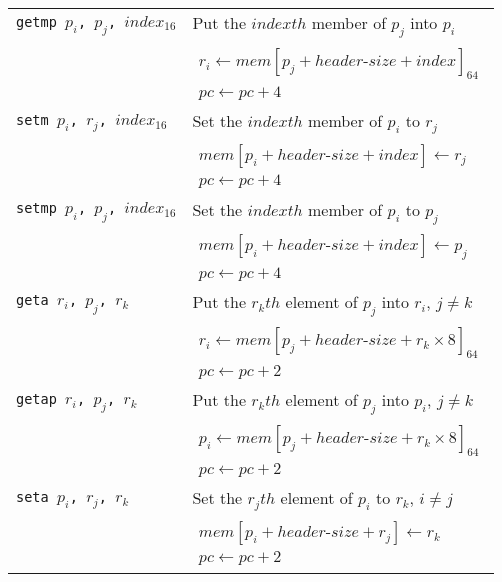 \begin{longtable}{|p{10em}|p{30em}|}
			\texttt{getmp $p_i$, $p_j$, $index_{16}$} & Put the $indexth$ member of $p_j$ into $p_i$ \\*
			& $\begin{array}{lcl}
			r_i \leftarrow mem[p_j + header\mbox{-}size + index]_{64} \\
			pc \leftarrow pc + 4
			\end{array}$ \\
			\hline
			\texttt{setm $p_i$, $r_j$, $index_{16}$} & Set the $indexth$ member of $p_i$ to $r_j$ \\*
			& $\begin{array}{lcl}
			mem[p_i + header\mbox{-}size + index] \leftarrow r_j \\
			pc \leftarrow pc + 4
			\end{array}$ \\
			\hline
			\texttt{setmp $p_i$, $p_j$, $index_{16}$} & Set the $indexth$ member of $p_i$ to $p_j$ \\*
			& $\begin{array}{lcl}
			mem[p_i + header\mbox{-}size + index] \leftarrow p_j \\
			pc \leftarrow pc + 4
			\end{array}$ \\
			\hline
			\texttt{geta $r_i$, $p_j$, $r_k$} & Put the $r_kth$ element of $p_j$ into $r_i$, $j\neq k$ \\*
			& $\begin{array}{lcl}
			r_i \leftarrow mem[p_j + header\mbox{-}size + r_k\times 8]_{64} \\
			pc \leftarrow pc + 2
			\end{array}$ \\
			\hline
			\texttt{getap $r_i$, $p_j$, $r_k$} & Put the $r_kth$ element of $p_j$ into $p_i$, $j\neq k$ \\*
			& $\begin{array}{lcl}
			p_i \leftarrow mem[p_j + header\mbox{-}size + r_k\times 8]_{64} \\
			pc \leftarrow pc + 2
			\end{array}$ \\
			\hline
			\texttt{seta $p_i$, $r_j$, $r_k$} & Set the $r_jth$ element of $p_i$ to $r_k$, $i\neq j$ \\*
			& $\begin{array}{lcl}
			mem[p_i + header\mbox{-}size + r_j] \leftarrow r_k \\
			pc \leftarrow pc + 2
			\end{array}$ \\

\end{longtable}
